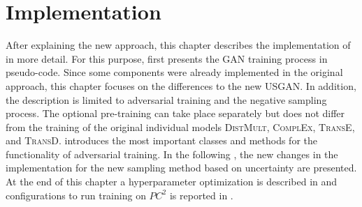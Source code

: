 \chapter{Implementation}
\label{ch:implementation}
%
After explaining the new approach, this chapter describes the implementation of \usgan in more detail.
For this purpose,  first presents the \ac{GAN} training process in pseudo-code.
Since some components were already implemented in the original \kbgan approach, this chapter focuses on the differences to the new \textsc{USGAN}.
In addition, the description is limited to adversarial training and the negative sampling process.
The optional pre-training can take place separately but does not differ from the training of the original individual models \textsc{DistMult}, \textsc{ComplEx}, \textsc{TransE}, and \textsc{TransD}.
 introduces the most important classes and methods for the functionality of adversarial training.
In the following , the new changes in the implementation for the new sampling method based on uncertainty are presented.
At the end of this chapter a hyperparameter optimization is described in  and configurations to run training on $PC^2$ is reported in .








\clearpage
